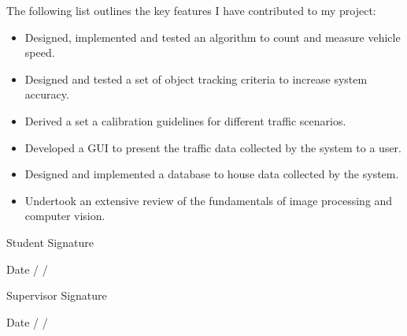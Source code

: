 \begin{contributions}
The following list outlines the key features I have contributed to my project:

\begin{itemize}
    \item Designed, implemented and tested an algorithm to count and measure vehicle speed.
    \item Designed and tested a set of object tracking criteria to increase system accuracy.
    \item Derived a set a calibration guidelines for different traffic scenarios.
    \item Developed a GUI to present the traffic data collected by the system to a user.
    \item Designed and implemented a database to house data collected by the system.
    \item Undertook an extensive review of the fundamentals of image processing and computer vision.  
\end{itemize}

  \vskip 0.5in 
  \normalsize {Student Signature \underline{\hspace{1.5in}}}
  
  \vskip 0.1in
  \normalsize {Date \underline{\hspace{0.5in}} / \underline{\hspace{0.5in}} / \underline{\hspace{0.5in}}}

  \vskip 0.5in 
  \normalsize {Supervisor Signature \underline{\hspace{1.5in}}}
  
  \vskip 0.1in
  \normalsize {Date \underline{\hspace{0.5in}} / \underline{\hspace{0.5in}} / \underline{\hspace{0.5in}}}
  

\end{contributions}